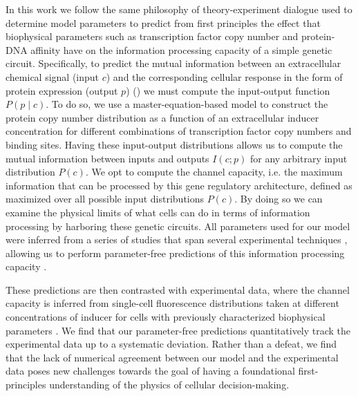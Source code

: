In this work we follow the same philosophy of theory-experiment dialogue used
to determine model parameters to predict from first principles the effect that
biophysical parameters such as transcription factor copy number and protein-DNA
affinity have on the information processing capacity of a simple genetic
circuit. Specifically, to predict the mutual information between an
extracellular chemical signal (input $c$) and the corresponding cellular
response in the form of protein expression (output $p$) ()
we must compute the input-output function $P(p \mid c)$. To do so, we use a
master-equation-based model to construct the protein copy number distribution
as a function of an extracellular inducer concentration for different
combinations of transcription factor copy numbers and binding sites. Having
these input-output distributions allows us to compute the mutual information
between inputs and outputs $I(c; p)$ for any arbitrary input distribution
$P(c)$. We opt to compute the channel capacity, i.e. the maximum information
that can be processed by this gene regulatory architecture, defined as
 maximized over all possible input distributions $P(c)$.
By doing so we can examine the physical limits of what cells can do in terms of
information processing by harboring these genetic circuits. All parameters used
for our model were inferred from a series of studies that span several
experimental techniques \cite{Garcia2011c, Jones2014a, Brewster2014,
Razo-Mejia2018}, allowing us to perform parameter-free predictions of this
information processing capacity \cite{Phillips2019}.

These predictions are then contrasted with experimental data, where the channel
capacity is inferred from single-cell fluorescence distributions taken at
different concentrations of inducer for cells with previously characterized
biophysical parameters \cite{Garcia2011c, Razo-Mejia2018}. We find that our
parameter-free predictions quantitatively track the experimental data up to a
systematic deviation. Rather than a defeat, we find that the lack of numerical
agreement between our model and the experimental data poses new challenges
towards the goal of having a foundational first-principles understanding of the
physics of cellular decision-making.

